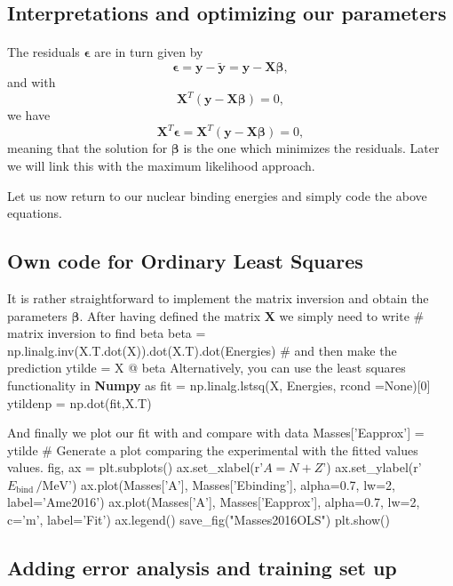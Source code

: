 \documentclass[%
oneside,                 %
final,                   %
10pt]{article}
\begin{document}
\subsection{Interpretations and optimizing our parameters}

\paragraph{}
The residuals $\bm{\epsilon}$ are in turn given by
\[
\bm{\epsilon} = \bm{y}-\bm{\tilde{y}} = \bm{y}-\bm{X}\bm{\beta},
\]
and with 
\[
\bm{X}^T\left( \bm{y}-\bm{X}\bm{\beta}\right)= 0, 
\]
we have
\[
\bm{X}^T\bm{\epsilon}=\bm{X}^T\left( \bm{y}-\bm{X}\bm{\beta}\right)= 0, 
\]
meaning that the solution for $\bm{\beta}$ is the one which minimizes the residuals.  Later we will link this with the maximum likelihood approach.




Let us now return to our nuclear binding energies and simply code the above equations. 

\subsection{Own code for Ordinary Least Squares}

It is rather straightforward to implement the matrix inversion and obtain the parameters $\bm{\beta}$. After having defined the matrix $\bm{X}$ we simply need to 
write
\bpycod
# matrix inversion to find beta
beta = np.linalg.inv(X.T.dot(X)).dot(X.T).dot(Energies)
# and then make the prediction
ytilde = X @ beta
\epycod
Alternatively, you can use the least squares functionality in \textbf{Numpy} as
\bpycod
fit = np.linalg.lstsq(X, Energies, rcond =None)[0]
ytildenp = np.dot(fit,X.T)
\epycod

And finally we plot our fit with and compare with data
\bpycod
Masses['Eapprox']  = ytilde
# Generate a plot comparing the experimental with the fitted values values.
fig, ax = plt.subplots()
ax.set_xlabel(r'$A = N + Z$')
ax.set_ylabel(r'$E_\mathrm{bind}\,/\mathrm{MeV}$')
ax.plot(Masses['A'], Masses['Ebinding'], alpha=0.7, lw=2,
            label='Ame2016')
ax.plot(Masses['A'], Masses['Eapprox'], alpha=0.7, lw=2, c='m',
            label='Fit')
ax.legend()
save_fig("Masses2016OLS")
plt.show()
\epycod

\subsection{Adding error analysis and training set up}
\end{document}
